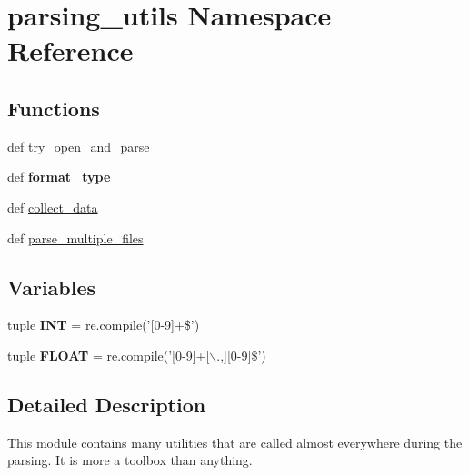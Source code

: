 \hypertarget{namespaceparsing__utils}{\section{parsing\-\_\-utils \-Namespace \-Reference}
\label{namespaceparsing__utils}
}
\subsection*{\-Functions}
\begin{DoxyCompactItemize}
\item 
def \hyperlink{namespaceparsing__utils_a26c14f2e6058ca8d95c4736e40d9a67a}{try\-\_\-open\-\_\-and\-\_\-parse}
\item 
\hypertarget{namespaceparsing__utils_a332025bb554b8559ab10e101fa976f5a}{def {\bfseries format\-\_\-type}}\label{namespaceparsing__utils_a332025bb554b8559ab10e101fa976f5a}

\item 
def \hyperlink{namespaceparsing__utils_a5b5e8f373e7060c8e92ac634aac95001}{collect\-\_\-data}
\item 
def \hyperlink{namespaceparsing__utils_a3c916b85614f8335586ba81162362fe6}{parse\-\_\-multiple\-\_\-files}
\end{DoxyCompactItemize}
\subsection*{\-Variables}
\begin{DoxyCompactItemize}
\item 
\hypertarget{namespaceparsing__utils_a9d5465b550734410b49f0c8d211c74c5}{tuple {\bfseries \-I\-N\-T} = re.\-compile('\mbox{[}0-\/9\mbox{]}+\$')}\label{namespaceparsing__utils_a9d5465b550734410b49f0c8d211c74c5}

\item 
\hypertarget{namespaceparsing__utils_a3c22f04fcad5a9e6c2aeb9de8cfbd419}{tuple {\bfseries \-F\-L\-O\-A\-T} = re.\-compile('\mbox{[}0-\/9\mbox{]}+\mbox{[}$\backslash$.,\mbox{]}\mbox{[}0-\/9\mbox{]}\$')}\label{namespaceparsing__utils_a3c22f04fcad5a9e6c2aeb9de8cfbd419}

\end{DoxyCompactItemize}


\subsection{\-Detailed \-Description}
\begin{DoxyVerb}
This module contains many utilities that are called almost everywhere
during the parsing.
It is more a toolbox than anything.
\end{DoxyVerb}
 

